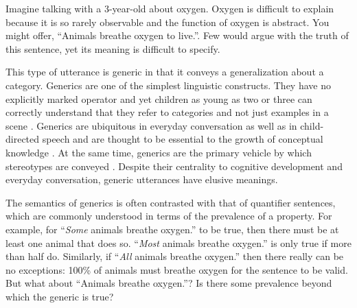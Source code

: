 \documentclass[10pt,letterpaper]{article}
\begin{document}
Imagine talking with a 3-year-old about oxygen. Oxygen is difficult to explain because it is so rarely observable and the function of oxygen is abstract. 
You might offer, ``Animals breathe oxygen to live.''. 
Few would argue with the truth of this sentence, yet its meaning is difficult to specify. 

%
This type of utterance is generic \cite{Carlson1977, Leslie2008} in that it conveys a generalization about a category.  Generics are one of the simplest linguistic constructs. 
They have no explicitly marked operator and yet children as young as two or three can correctly understand that they refer to categories and not just examples in a scene \cite{Cimpian2008}. 
Generics are ubiquitous in everyday conversation as well as in child-directed speech \cite{Gelman2008} and are thought to be essential to the growth of conceptual knowledge \cite{Gelman2004}. 
At the same time, generics are the primary vehicle by which stereotypes are conveyed \cite{GelmanEtAl2004, Cimpian2010motivation, Leslie2015}.
Despite their centrality to cognitive development and everyday conversation, generic utterances have elusive meanings. %

The semantics of generics is often contrasted with that of quantifier sentences, which are commonly understood in terms of the prevalence of a property. 
For example, for ``\emph{Some} animals breathe oxygen.'' to be true, then there must be at least one animal that does so. 
``\emph{Most} animals breathe oxygen.'' is only true if more than half do. 
Similarly, if ``\emph{All} animals breathe oxygen.'' then there really can be no exceptions: 100\% of animals must breathe oxygen for the sentence to be valid. 
But what about ``Animals breathe oxygen.''? 
Is there some prevalence beyond which the generic is true?
\end{document}
